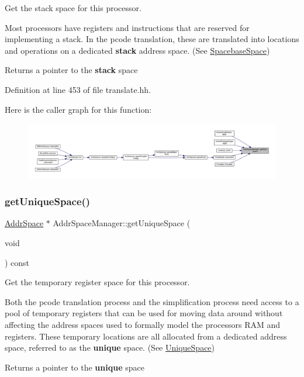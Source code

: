 Get the stack space for this processor. 

Most processors have registers and instructions that are reserved for implementing a stack. In the pcode translation, these are translated into locations and operations on a dedicated {\bfseries{stack}} address space. (See \mbox{\hyperlink{class_spacebase_space}{Spacebase\+Space}}) \begin{DoxyReturn}{Returns}
a pointer to the {\bfseries{stack}} space 
\end{DoxyReturn}


Definition at line 453 of file translate.\+hh.

Here is the caller graph for this function\+:
\nopagebreak
\begin{figure}[H]
\begin{center}
\leavevmode
\includegraphics[width=350pt]{class_addr_space_manager_a00f3afd0adb68f208c31a9716abe5a4f_icgraph}
\end{center}
\end{figure}
\mbox{\label{class_addr_space_manager_ab7428d74e76200ecc3c99a0e1ad7f613}} 
\subsubsection{\texorpdfstring{getUniqueSpace()}{getUniqueSpace()}}
{\footnotesize\ttfamily \mbox{\hyperlink{class_addr_space}{Addr\+Space}} $\ast$ Addr\+Space\+Manager\+::get\+Unique\+Space (\begin{DoxyParamCaption}\item[{void}]{ }\end{DoxyParamCaption}) const\hspace{0.3cm}{\ttfamily [inline]}}



Get the temporary register space for this processor. 

Both the pcode translation process and the simplification process need access to a pool of temporary registers that can be used for moving data around without affecting the address spaces used to formally model the processor\textquotesingle{}s R\+AM and registers. These temporary locations are all allocated from a dedicated address space, referred to as the {\bfseries{unique}} space. (See \mbox{\hyperlink{class_unique_space}{Unique\+Space}}) \begin{DoxyReturn}{Returns}
a pointer to the {\bfseries{unique}} space 
\end{DoxyReturn}


